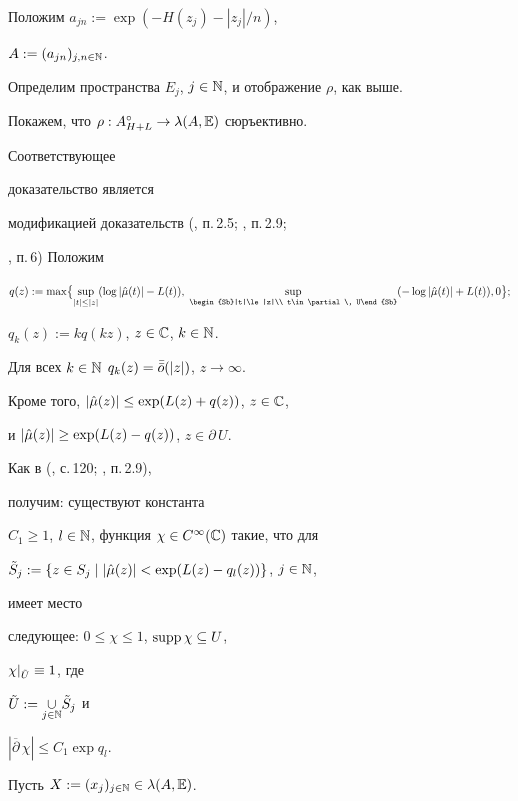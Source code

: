 \begin{pf} Положим $a_{jn}:=\exp(-H(z_j)-|z_j|/n)$, 


$A:=(a_{jn})_{j,n\in\Bbb N}$. 


Определим пространства $E_j$, $j\in\Bbb N$, и отображение $\rho$, как выше. 


 


Покажем, что $\rho :A^\circ_{H+L}\to\lambda(A,\Bbb E)$ сюръективно. 


Соответствующее 


доказательство является 


модификацией доказательств (\cite{Mei1}, п.\,2.5; \cite{Momm4}, п.\,2.9; 


\cite{Momm2}, п.\,6) Положим 


$q(z):=\max\bigl\{\sup\limits_{|t|\le|z|}(\log|\Hat\mu(t)|-L(t)),\; 


\sup\limits_{\begin{Sb}|t|\le|z|\\ t\in\partial\, U\end{Sb}} 


(-\log|\Hat\mu(t)|+L(t)),0\bigr\};$ 


$q_k(z):=kq(kz)$, $z\in\Bbb C$, $k\in\Bbb N$. 


Для всех $k\in\Bbb N$ $q_k(z)=\Bar{\Bar o}(|z|)$, $z\to\infty$. 


Кроме того, $|\Hat\mu(z)|\le\exp(L(z)+q(z))$, $z\in\Bbb C$, 


и $|\Hat\mu(z)|\ge\exp(L(z)-q(z))$, $z\in\partial\, U$. 


Как в (\cite{Ber}, с.\,120; \cite{Momm4}, п.\,2.9), 


получим: существуют константа 


$C_1\ge 1$, $l\in\Bbb N$, функция $\chi\in C^\infty(\Bbb C)$ такие, что для 


$\Tilde S_j:=\{z\in S_j\mid|\Hat\mu(z)|<\exp(L(z)-q_l(z))\}$, $j\in\Bbb N$, 


имеет место 


следующее: $0\le\chi\le 1$, $\operatorname{supp}\chi\subseteq U$, 


$\chi\vert_{\Tilde U}\equiv 1$, где


$\Tilde U:=\underset{j\in\Bbb N}{\cup}\Tilde S_j$ и 


$|\overline\partial\,\chi|\le C_1\exp q_l$. 


 


Пусть $X:=(x_j)_{j\in\Bbb N}\in\lambda(A,\Bbb E)$. 



\end{pf}
